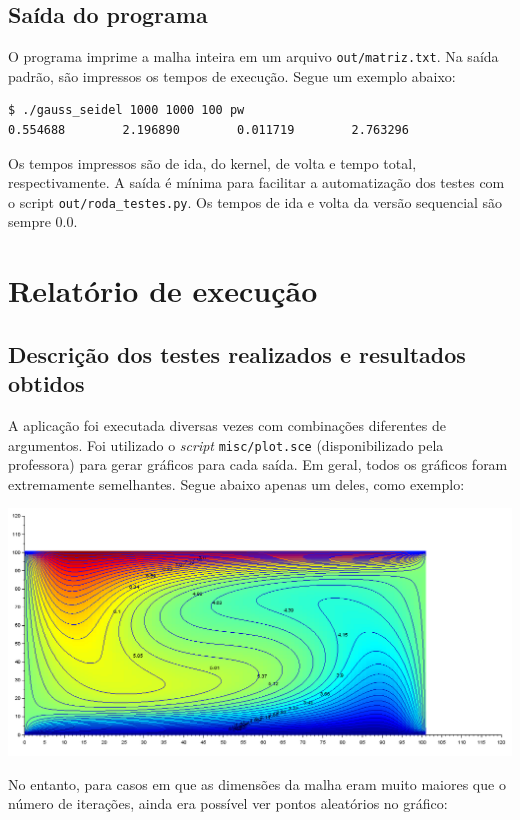 \documentclass[a4paper,landscape,11pt]{article}
\begin{document}
\subsection{Saída do programa}

O programa imprime a malha inteira em um arquivo \texttt{out/matriz.txt}. Na saída padrão, são impressos os tempos de execução. Segue um exemplo abaixo:

\begin{verbatim}
$ ./gauss_seidel 1000 1000 100 pw
0.554688        2.196890        0.011719        2.763296
\end{verbatim}

Os tempos impressos são de ida, do kernel, de volta e tempo total, respectivamente. A saída é mínima para facilitar a automatização dos testes com o script \texttt{out/roda\_testes.py}. Os tempos de ida e volta da versão sequencial são sempre 0.0.

\section{Relatório de execução}

\subsection{Descrição dos testes realizados e resultados obtidos}
A aplicação foi executada diversas vezes com combinações diferentes de argumentos. Foi utilizado o \textit{script} \texttt{misc/plot.sce} (disponibilizado pela professora) para gerar gráficos para cada saída. Em geral, todos os gráficos foram extremamente semelhantes. Segue abaixo apenas um deles, como exemplo:

\includegraphics[width=\textwidth]{images/grafico_correto}

No entanto, para casos em que as dimensões da malha eram muito maiores que o número de iterações, ainda era possível ver pontos aleatórios no gráfico:
\end{document}
